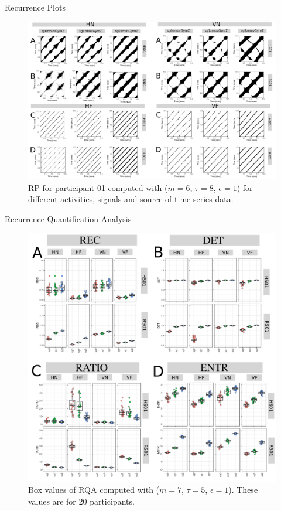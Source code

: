 {
\begin{frame}{Recurrence Plots}
    \begin{figure}
        \includegraphics[width=0.8\linewidth]{./figs/results/ch6-rp/versions/drawing-v00}{}
	\caption{RP for participant 01 computed 
	with ($m=6$, $\tau=8$, $\epsilon=1$)
	for different activities, signals and source of time-series data.
	} 
   \end{figure}
	
\end{frame}
}




{

\begin{frame}{Recurrence Quantification Analysis}
    \begin{figure}
        \includegraphics[width=0.45\linewidth]{./figs/results/ch6-rqa/versions/drawing-v00}{}
	\caption{Box values of  RQA computed with 
	($m=7$, $\tau=5$, $\epsilon=1$). 
	These values are for 20 participants.
} 
   \end{figure}
	
\end{frame}
}


